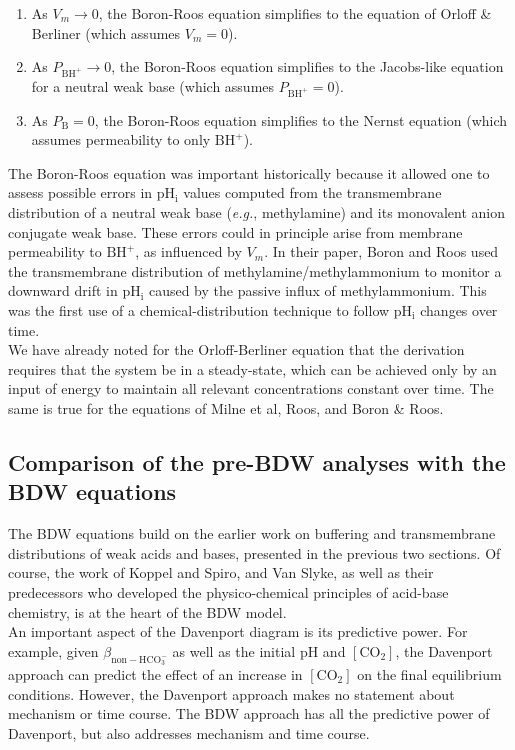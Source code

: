 \documentclass[fleqn,10pt]{physiome}
\begin{document}
\begin{enumerate}[noitemsep] 
\item As $V_m \rightarrow 0$, the Boron-Roos equation simplifies to the equation of Orloff \& Berliner (which assumes $V_m=0$).
\item As $P_\mathrm{BH^+} \rightarrow 0$, the Boron-Roos equation simplifies to the Jacobs-like equation for a neutral weak base (which assumes $P_\mathrm{BH^+}=0$).
\item As $P_\mathrm{B}=0$, the Boron-Roos equation simplifies to the Nernst equation (which assumes permeability to only $\mathrm{BH^+}$).
\end{enumerate}

The Boron-Roos equation was important historically because it allowed one to assess possible errors in $\mathrm{pH_i}$ values computed from the transmembrane distribution of a neutral weak base (\emph{e.g.}, methylamine) and its monovalent anion conjugate weak base. These errors could in principle arise from membrane permeability to $\mathrm{BH^+}$, as influenced by $V_m$. In their paper, Boron and Roos used the transmembrane distribution of methylamine/methylammonium to monitor a downward drift in $\mathrm{pH_i}$ caused by the passive influx of methylammonium. This was the first use of a chemical-distribution technique to follow $\mathrm{pH_i}$ changes over time.\\

We have already noted for the Orloff-Berliner equation that the derivation requires that the system be in a steady-state, which can be achieved only by an input of energy to maintain all relevant concentrations constant over time. The same is true for the equations of Milne et al, Roos, and Boron \& Roos.

\subsection{Comparison of the pre-BDW analyses with the BDW equations}

The BDW equations build on the earlier work on buffering and transmembrane distributions of weak acids and bases, presented in the previous two sections. Of course, the work of Koppel and Spiro, and Van Slyke, as well as their predecessors who developed the physico-chemical principles of acid-base chemistry, is at the heart of the BDW model.\\

An important aspect of the Davenport diagram is its predictive power. For example, given $\beta_\mathrm{non-HCO_3^-}$ as well as the initial $\mathrm{pH}$ and $\mathrm{[CO_2]}$, the Davenport approach can predict the effect of an increase in $\mathrm{[CO_2]}$ on the final equilibrium conditions. However, the Davenport approach makes no statement about mechanism or time course. The BDW approach has all the predictive power of Davenport, but also addresses mechanism and time course.\\
\end{document}
